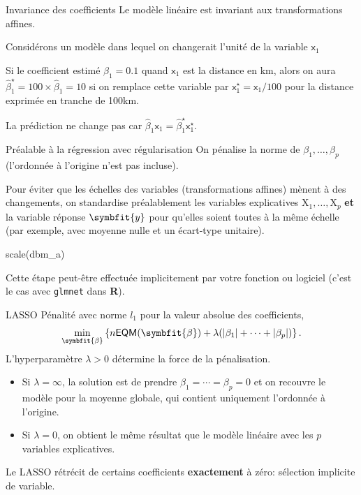 \documentclass[
  ignorenonframetext,
]{beamer}
\newenvironment{Shaded}{\begin{snugshade}}{\end{snugshade}}
\newcommand{\FunctionTok}[1]{\textcolor[rgb]{0.28,0.35,0.67}{#1}}
\newcommand{\NormalTok}[1]{\textcolor[rgb]{0.00,0.23,0.31}{#1}}
\providecommand{\tightlist}{%
  \setlength{\itemsep}{0pt}\setlength{\parskip}{0pt}}
\renewcommand{\boldsymbol}[1]{\symbfit{#1}}
\begin{document}
\begin{frame}{Invariance des coefficients}
\protect{}\label{invariance-des-coefficients}
Le modèle linéaire est invariant aux transformations affines.

Considérons un modèle dans lequel on changerait l'unité de la variable
\(\mathsf{x}_1\)

Si le coefficient estimé \(\widehat{\beta}_1=0.1\) quand
\(\mathsf{x}_1\) est la distance en km, alors on aura
\(\widehat{\beta}^\star_1=100 \times \widehat{\beta}_1 = 10\) si on
remplace cette variable par
\(\mathsf{x}^{\star}_1 = \mathsf{x}_1 / 100\) pour la distance exprimée
en tranche de 100km.

La prédiction ne change pas car
\(\widehat{\beta}_1\mathsf{x}_1=\widehat{\beta}^\star_1\mathsf{x}^{\star}_1\).
\end{frame}

\begin{frame}[fragile]{Préalable à la régression avec régularisation}
\protect{}\label{pruxe9alable-uxe0-la-ruxe9gression-avec-ruxe9gularisation}
On pénalise la norme de \(\beta_1, \ldots, \beta_p\) (l'ordonnée à
l'origine n'est pas incluse).

Pour éviter que les échelles des variables (transformations affines)
mènent à des changements, on standardise préalablement les variables
explicatives \(\mathrm{X}_1, \ldots, \mathrm{X}_p\) \textbf{et} la
variable réponse \(\boldsymbol{y}\) pour qu'elles soient toutes à la
même échelle (par exemple, avec moyenne nulle et un écart-type
unitaire).

\begin{Shaded}
\begin{Highlighting}[numbers=left,,]
\FunctionTok{scale}\NormalTok{(dbm\_a)}
\end{Highlighting}
\end{Shaded}

Cette étape peut-être effectuée implicitement par votre fonction ou
logiciel (c'est le cas avec \texttt{glmnet} dans \textbf{R}).
\end{frame}

\begin{frame}{LASSO}
\protect{}\label{lasso}
Pénalité avec norme \(l_1\) pour la valeur absolue des coefficients,
\[ \min_{\boldsymbol{\beta}} \left\{ n\mathsf{EQM}(\boldsymbol{\beta}) + \lambda(|\beta_1| + \cdots + |\beta_p|)\right\}.\]
L'hyperparamètre \(\lambda>0\) détermine la force de la pénalisation.

\begin{itemize}
\tightlist
\item
  Si \(\lambda=\infty\), la solution est de prendre
  \(\beta_1 = \cdots = \beta_p=0\) et on recouvre le modèle pour la
  moyenne globale, qui contient uniquement l'ordonnée à l'origine.
\item
  Si \(\lambda=0\), on obtient le même résultat que le modèle linéaire
  avec les \(p\) variables explicatives.
\end{itemize}

Le LASSO rétrécit de certains coefficients \textbf{exactement} à zéro:
sélection implicite de variable.
\end{frame}
\end{document}
